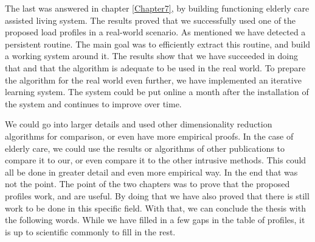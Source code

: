 The last was answered in chapter \ref{Chapter7}, by building functioning elderly care assisted living system. 
The results proved that we successfully used one of the proposed load profiles in a real-world scenario. 
As mentioned we have detected a persistent routine. The main goal was to efficiently extract this routine, and build a working system around it.
The results show that we have succeeded in doing that and that the algorithm is adequate to be used in the real world.
To prepare the algorithm for the real world even further, we have implemented an iterative learning system.
The system could be put online a month after the installation of the system and continues to improve over time.

We could go into larger details and used other dimensionality reduction algorithms for comparison, or even have more empirical proofs. 
In the case of elderly care, we could use the results or algorithms of other publications to compare it to our, or even compare it to the other intrusive methods. 
This could all be done in greater detail and even more empirical way.
In the end that was not the point.
The point of the two chapters was to prove that the proposed profiles work, and are useful. 
By doing that we have also proved that there is still work to be done in this specific field.
With that, we can conclude the thesis with the following words.
While we have filled in a few gaps in the table of profiles, it is up to scientific commonly to fill in the rest. 